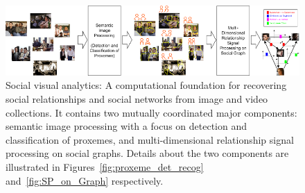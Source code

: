 \begin{figure}[t!]
\begin{center}
\includegraphics[width=\columnwidth]{overview}
\end{center}
\vspace{-0.25in} \caption{\captionsize 
Social visual analytics: A computational foundation for recovering social relationships and social networks from image and video collections. It contains two mutually coordinated major components: semantic image processing with a focus on detection and classification of proxemes, and multi-dimensional relationship signal processing on social graphs.  Details about the two components are illustrated in Figures~\ref{fig:proxeme_det_recog} and~\ref{fig:SP_on_Graph} respectively.\label{fig:intro}\afterfigspace}
\end{figure}













